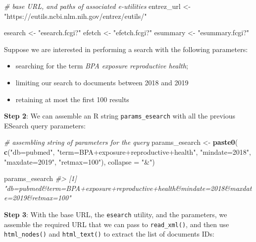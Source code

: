 \documentclass[
]{book}
\newenvironment{Shaded}{\begin{snugshade}}{\end{snugshade}}
\newcommand{\AttributeTok}[1]{\textcolor[rgb]{0.13,0.29,0.53}{#1}}
\newcommand{\CommentTok}[1]{\textcolor[rgb]{0.56,0.35,0.01}{\textit{#1}}}
\newcommand{\FunctionTok}[1]{\textcolor[rgb]{0.13,0.29,0.53}{\textbf{#1}}}
\newcommand{\NormalTok}[1]{#1}
\newcommand{\OtherTok}[1]{\textcolor[rgb]{0.56,0.35,0.01}{#1}}
\newcommand{\StringTok}[1]{\textcolor[rgb]{0.31,0.60,0.02}{#1}}
\begin{document}
\begin{Shaded}
\begin{Highlighting}[]
\CommentTok{\# base URL, and paths of associated e{-}utilities}
\NormalTok{entrez\_url }\OtherTok{\textless{}{-}} \StringTok{"https://eutils.ncbi.nlm.nih.gov/entrez/eutils/"}

\NormalTok{esearch }\OtherTok{\textless{}{-}} \StringTok{"esearch.fcgi?"}
\NormalTok{efetch }\OtherTok{\textless{}{-}} \StringTok{"efetch.fcgi?"}
\NormalTok{esummary }\OtherTok{\textless{}{-}} \StringTok{"esummary.fcgi?"}
\end{Highlighting}
\end{Shaded}

Suppose we are interested in performing a search with the following parameters:

\begin{itemize}
\item
  searching for the term \emph{BPA exposure reproductive health};
\item
  limiting our search to documents between 2018 and 2019
\item
  retaining at most the first 100 results
\end{itemize}

\textbf{Step 2}: We can assemble an R string \texttt{params\_esearch} with all the previous
ESearch query parameters:

\begin{Shaded}
\begin{Highlighting}[]
\CommentTok{\# assembling string of parameters for the query}
\NormalTok{params\_esearch }\OtherTok{\textless{}{-}} \FunctionTok{paste0}\NormalTok{(}
  \FunctionTok{c}\NormalTok{(}\StringTok{"db=pubmed"}\NormalTok{, }
    \StringTok{"term=BPA+exposure+reproductive+health"}\NormalTok{,}
    \StringTok{"mindate=2018"}\NormalTok{,}
    \StringTok{"maxdate=2019"}\NormalTok{,}
    \StringTok{"retmax=100"}\NormalTok{),}
  \AttributeTok{collapse =} \StringTok{"\&"}\NormalTok{)}

\NormalTok{params\_esearch}
\CommentTok{\#\textgreater{} [1] "db=pubmed\&term=BPA+exposure+reproductive+health\&mindate=2018\&maxdate=2019\&retmax=100"}
\end{Highlighting}
\end{Shaded}

\textbf{Step 3}: With the base URL, the \texttt{esearch} utility, and the parameters, we
assemble the required URL that we can pass to \texttt{read\_xml()}, and then use
\texttt{html\_nodes()} and \texttt{html\_text()} to extract the list of documents IDs:
\end{document}
